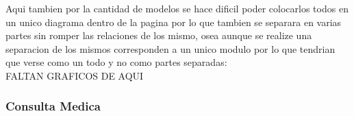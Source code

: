 Aqui tambien por la cantidad de modelos se hace dificil poder colocarlos todos 
en un unico diagrama dentro de la pagina por lo que tambien se separara en 
varias partes sin romper las relaciones de los mismo, osea aunque se realize 
una separacion de los mismos corresponden a un unico modulo por lo que tendrian 
que verse como un todo y no como partes separadas: \\[0.1cm]




FALTAN GRAFICOS DE AQUI


\subsubsection{Consulta Medica}



